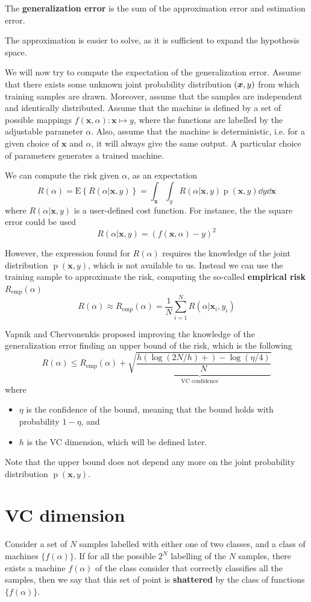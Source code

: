 \documentclass[oneside,onecolumn]{report}
\newcommand{\E}[1]{\text{E} \left\{ #1 \right\}}
\DeclareMathOperator*{\pdf}{p}
\let\P\relax
\DeclareMathOperator*{\P}{P}
\begin{document}
The \textbf{generalization error} is the sum of the approximation error and estimation error.

The approximation is easier to solve, as it is sufficient to expand the hypothesis space.

We will now try to compute the expectation of the generalization error.
Assume that there exists some unknown joint probability distribution $\P(\bm x, y)$ from which training samples are drawn.
Moreover, assume that the samples are independent and identically distributed.
Assume that the machine is defined by a set of possible mappings $f(\bm x, \alpha): \bm x \mapsto y$, where the functions are labelled by the adjustable parameter $\alpha$.
Also, assume that the machine is deterministic, i.e. for a given choice of $\bm x$ and $\alpha$, it will always give the same output. A particular choice of parameters generates a trained machine.

We can compute the risk given $\alpha$, as an expectation
$$ R(\alpha) = \E{R(\alpha | \bm x, y)} = \int_{\bm x} \int_y R(\alpha | \bm x, y) \pdf(\bm x, y) \dd y \dd \bm x $$
where $R(\alpha | \bm x, y)$ is a user-defined cost function.
For instance, the the square error could be used
$$ R(\alpha | \bm x, y) = (f(\bm x, \alpha) - y)^2 $$

However, the expression found for $R(\alpha)$ requires the knowledge of the joint distribution $\pdf(\bm x, y)$, which is not available to us.
Instead we can use the training sample to approximate the risk, computing the so-called \textbf{empirical risk} $R_\text{emp}(\alpha)$
$$ R(\alpha) \approx R_\text{emp}(\alpha) = \frac{1}{N} \sum_{i = 1}^N R(\alpha| \bm x_i, y_i) $$

Vapnik and Chervonenkis proposed improving the knowledge of the generalization error finding an upper bound of the risk, which is the following
$$ R(\alpha) \leq R_\text{emp}(\alpha) + \underbrace{\sqrt{\frac{h(\log(2 N / h) + ) - \log(\eta/4)}{N}}}_\text{VC confidence} $$
where
\begin{itemize}
    \item $\eta$ is the confidence of the bound, meaning that the bound holds with probability $1 - \eta$, and
    \item $h$ is the VC dimension, which will be defined later.
\end{itemize}
Note that the upper bound does not depend any more on the joint probability distribution $\pdf(\bm x, y)$.

\section{VC dimension}
Consider a set of $N$ samples labelled with either one of two classes, and a class of machines $\{f(\alpha)\}$.
If for all the possible $2^N$ labelling of the $N$ samples, there exists a machine $f(\alpha)$ of the class consider that correctly classifies all the samples, then we say that this set of point is \textbf{shattered} by the class of functions $\{f(\alpha)\}$.
\end{document}
